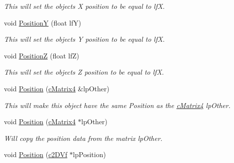 \begin{DoxyCompactItemize}
\begin{DoxyCompactList}\small\item\em This will set the objects X position to be equal to lfX. \end{DoxyCompactList}\item 
\hypertarget{classc_matrix4_a4f7469486d7557e158ebc70a261c853c}{
void \hyperlink{classc_matrix4_a4f7469486d7557e158ebc70a261c853c}{PositionY} (float lfY)}
\label{classc_matrix4_a4f7469486d7557e158ebc70a261c853c}

\begin{DoxyCompactList}\small\item\em This will set the objects Y position to be equal to lfX. \end{DoxyCompactList}\item 
\hypertarget{classc_matrix4_a6baf253feb5e27b5e3e81971d9f5d718}{
void \hyperlink{classc_matrix4_a6baf253feb5e27b5e3e81971d9f5d718}{PositionZ} (float lfZ)}
\label{classc_matrix4_a6baf253feb5e27b5e3e81971d9f5d718}

\begin{DoxyCompactList}\small\item\em This will set the objects Z position to be equal to lfX. \end{DoxyCompactList}\item 
\hypertarget{classc_matrix4_a79457e17d6ab9a0c5db16c94405be35c}{
void \hyperlink{classc_matrix4_a79457e17d6ab9a0c5db16c94405be35c}{Position} (\hyperlink{classc_matrix4}{cMatrix4} \&lpOther)}
\label{classc_matrix4_a79457e17d6ab9a0c5db16c94405be35c}

\begin{DoxyCompactList}\small\item\em This will make this object have the same Position as the \hyperlink{classc_matrix4}{cMatrix4} lpOther. \end{DoxyCompactList}\item 
\hypertarget{classc_matrix4_a6e0051199566d89193d7c2e07e957eb4}{
void \hyperlink{classc_matrix4_a6e0051199566d89193d7c2e07e957eb4}{Position} (\hyperlink{classc_matrix4}{cMatrix4} $\ast$lpOther)}
\label{classc_matrix4_a6e0051199566d89193d7c2e07e957eb4}

\begin{DoxyCompactList}\small\item\em Will copy the position data from the matrix lpOther. \end{DoxyCompactList}\item 
\hypertarget{classc_matrix4_ac182a447e047d9071b035b374e8abf45}{
void \hyperlink{classc_matrix4_ac182a447e047d9071b035b374e8abf45}{Position} (\hyperlink{classc2_d_vf}{c2DVf} $\ast$lpPosition)}
\label{classc_matrix4_ac182a447e047d9071b035b374e8abf45}


\end{DoxyCompactItemize}
